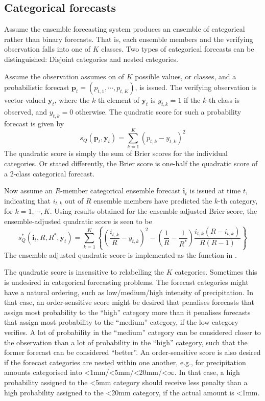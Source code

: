 \documentclass[article]{jss}\usepackage{graphicx, color}
\begin{document}
\subsection{Categorical forecasts}


Assume the ensemble forecasting system produces an ensemble of categorical rather than binary forecasts.
That is, each ensemble members and the verifying observation falls into one of $K$ classes.
Two types of categorical forecasts can be distinguished: Disjoint categories and nested categories.

Assume the observation assumes on of $K$ possible values, or classes, and a probabilistic forecast $\mathbf{p}_t = (p_{t,1}, \cdots, p_{t,K})$, is issued.
The verifying observation is vector-valued $\mathbf{y}_t$, where the $k$-th element of $\mathbf{y}_t$ is $y_{t,k}=1$ if the $k$-th class is observed, and $y_{t,k}=0$ otherwise.
The quadratic score for such a probability forecast is given by
%
\begin{equation}
s_{Q}(\mathbf{p}_t, \mathbf{y}_t) = \sum_{k=1}^K \left(p_{t,k} - y_{t,k}\right)^2
\end{equation}
%
The quadratic score is simply the sum of Brier scores for the individual categories.
Or stated differently, the Brier score is one-half the quadratic score of a 2-class categorical forecast.

Now assume an $R$-member categorical ensemble forecast $\mathbf{i}_t$ is issued at time $t$, indicating that $i_{t,k}$ out of $R$ ensemble members have predicted the $k$-th category, for $k=1,\cdots,K$.
Using results obtained for the ensemble-adjusted Brier score, the ensemble-adjusted quadratic score is seen to be
%
\begin{equation}
s_{Q}^*(\mathbf{i}_t, R, R^*, \mathbf{y}_t) = \sum_{k=1}^K \left\{ \left(\frac{i_{t,k}}{R} - y_{t,k}\right)^2 - \left(\frac{1}{R} - \frac{1}{R^*}\right) \frac{i_{t,k}(R-i_{t,k})}{R(R-1)}\right\}
\end{equation}
%
The ensemble adjusted quadratic score is implemented as the function  in .


The quadratic score is insensitive to relabelling the $K$ categories.
Sometimes this is undesired in categorical forecasting problems. 
The forecast categories might have a natural ordering, such as low/medium/high intensity of precipitation.
In that case, an order-sensitive score might be desired that penalises forecasts that assign most probability to the ``high'' category more than it penalises forecasts that assign most probability to the ``medium'' category, if the low category verifies. 
A lot of probability in the ``medium'' category can be considered closer to the observation than a lot of probability in the ``high'' category, such that the former forecast can be considered ``better''.
An order-sensitive score is also desired if the forecast categories are nested within one another, e.g., for precipitation amounts categorised into <1mm/<5mm/<20mm/<$\infty$.
In that case, a high probability assigned to the <5mm category should receive less penalty than a high probability assigned to the <20mm category, if the actual amount is <1mm.
\end{document}
